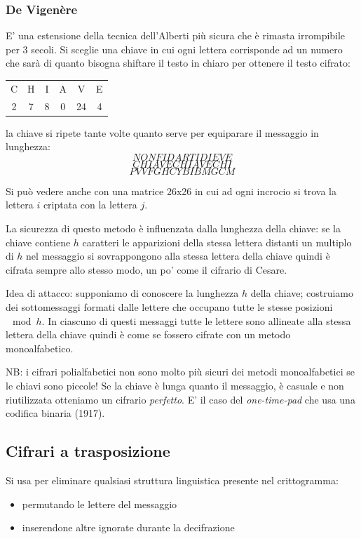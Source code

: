 \subsubsection{De Vigenère}
E' una estensione della tecnica dell'Alberti più sicura che è rimasta irrompibile per 3 secoli. Si sceglie una chiave in cui ogni lettera corrisponde ad un numero che sarà di quanto bisogna shiftare il testo in chiaro per ottenere il testo cifrato:
\begin{table}[ht!]
    \centering
    \begin{tabular}{c c c c c c}
        C & H & I & A & V & E \\
        2 & 7 & 8 & 0 & 24 & 4
    \end{tabular}
\end{table}
la chiave si ripete tante volte quanto serve per equiparare il messaggio in lunghezza:
$$ NONFIDARTIDIEVE $$
$$ CHIAVECHIAVECHI $$
$$ PVVFGHCYBIBMGCM $$

Si può vedere anche con una matrice 26x26 in cui ad ogni incrocio si trova la lettera $i$ criptata con la lettera $j$.

La sicurezza di questo metodo è influenzata dalla lunghezza della chiave: se la chiave contiene $h$ caratteri le apparizioni della stessa lettera distanti un multiplo di $h$ nel messaggio si sovrappongono alla stessa lettera della chiave quindi è cifrata sempre allo stesso modo, un po' come il cifrario di Cesare.

Idea di attacco: supponiamo di conoscere la lunghezza $h$ della chiave; costruiamo dei sottomessaggi formati dalle lettere che occupano tutte le stesse posizioni $\mod h$. In ciascuno di questi messaggi tutte le lettere sono allineate alla stessa lettera della chiave quindi è come se fossero cifrate con un metodo monoalfabetico.

NB: i cifrari polialfabetici non sono molto più sicuri dei metodi monoalfabetici se le chiavi sono piccole! Se la chiave è lunga quanto il messaggio, è casuale e non riutilizzata otteniamo un cifrario \emph{perfetto}. E' il caso del \emph{one-time-pad} che usa una codifica binaria (1917).

\subsection{Cifrari a trasposizione}
Si usa per eliminare qualsiasi struttura linguistica presente nel crittogramma:
\begin{itemize}
    \item permutando le lettere del messaggio
    \item inserendone altre ignorate durante la decifrazione
\end{itemize}


